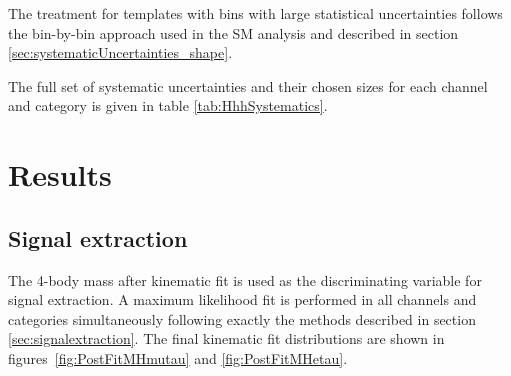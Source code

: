 The treatment for templates with bins with large statistical uncertainties
follows the bin-by-bin approach used in the \ac{SM} analysis and described in
section \ref{sec:systematicUncertainties_shape}. 

The full set of systematic
uncertainties and their chosen sizes for each channel and category is given in
table \ref{tab:HhhSystematics}.



\section{Results}
\label{sec:Hhhresults}

\subsection{Signal extraction}

The 4-body mass after kinematic fit is used as the discriminating variable for
signal extraction. A maximum likelihood fit is performed in all channels and
categories simultaneously following exactly the methods described in section
\ref{sec:signalextraction}. The final kinematic fit distributions are shown in
figures~\ref{fig:PostFitMHmutau} and \ref{fig:PostFitMHetau}.

